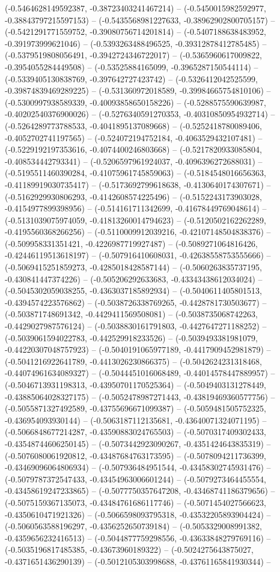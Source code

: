 (-0.5464628149592387, -0.38723403241467214) -- (-0.5450015982592977, -0.38843797215597153) -- (-0.5435568981227633, -0.38962902800705157) -- (-0.5421291771559752, -0.39080756714201814) -- (-0.5407188638483952, -0.391973999621046) -- (-0.5393263488496525, -0.39312878412785485) -- (-0.5379519808056491, -0.3942724346722017) -- (-0.5365960617009822, -0.3954055284449508) -- (-0.53525884165099, -0.3965287150544114) -- (-0.5339405130838769, -0.397642727423742) -- (-0.5326412042525599, -0.39874839469289225) -- (-0.531360972018589, -0.39984665754810106) -- (-0.5300997938589339, -0.40093858650158226) -- (-0.5288575590639987, -0.40202540376900026) -- (-0.5276340591270353, -0.40310850954932714) -- (-0.5264289773788533, -0.4041895137089668) -- (-0.5252418780089406, -0.4052702741197565) -- (-0.524072194752184, -0.4063529432107481) -- (-0.5229192197353616, -0.4074400246803668) -- (-0.5217820933085804, -0.408534442793341) -- (-0.5206597961924037, -0.4096396272688031) -- (-0.5195511460390284, -0.41075961745859063) -- (-0.5184548016656363, -0.41189919030735417) -- (-0.5173692799618638, -0.4130640174307671) -- (-0.5162929930806293, -0.4142608574225496) -- (-0.5152243173903028, -0.4154977899398956) -- (-0.514161711342699, -0.41678449769048614) -- (-0.5131039075974059, -0.41813260014794623) -- (-0.5120502162262289, -0.4195560368266256) -- (-0.5110009912039216, -0.42107148504838376) -- (-0.509958331351421, -0.4226987719927487) -- (-0.5089271064816426, -0.42446119513618197) -- (-0.507916410608031, -0.42638558753555666) -- (-0.5069415251859273, -0.4285018428587144) -- (-0.5060263835737195, -0.430841447374226) -- (-0.505206292633683, -0.43343438612034024) -- (-0.5045302059038255, -0.4363037185892934) -- (-0.5040611405801513, -0.4394574223576862) -- (-0.5038726338769265, -0.4428781730503677) -- (-0.503871748691342, -0.4429411569508081) -- (-0.5038735068742263, -0.4429027987576124) -- (-0.5038830161791803, -0.4427647271188252) -- (-0.5039061594022783, -0.442529918233526) -- (-0.5039493381981079, -0.44220307048757923) -- (-0.5040191065977189, -0.4417909452981879) -- (-0.5041216922641789, -0.4413026230866375) -- (-0.5042624231318468, -0.44074961634089327) -- (-0.5044451016068489, -0.44014578447889957) -- (-0.5046713931198313, -0.43950701170525364) -- (-0.5049403131278449, -0.43885064028327175) -- (-0.5052478987271443, -0.43819469360577756) -- (-0.5055871327492589, -0.43755696671099387) -- (-0.5059481505752325, -0.436954093930144) -- (-0.5063187112135681, -0.43640071324071195) -- (-0.5066848677214287, -0.43590883024765503) -- (-0.5070317409302433, -0.43548744606250145) -- (-0.5073442923090267, -0.4351424643835319) -- (-0.5076080061920812, -0.43487684763173595) -- (-0.5078094211736399, -0.43469096064806934) -- (-0.507936484951544, -0.43458302745931476) -- (-0.5079787372547433, -0.43454963006601244) -- (-0.5079273464455554, -0.43458619247233865) -- (-0.5077750357647208, -0.43468741186379656) -- (-0.5075159367135073, -0.43484761686117746) -- (-0.5071454027566623, -0.4350610471921326) -- (-0.5066598093795318, -0.43532205893904424) -- (-0.5060563588196297, -0.4356252650739184) -- (-0.5053329008991382, -0.4359656232416513) -- (-0.5044877759298556, -0.43633848279769116) -- (-0.5035196817485385, -0.43673960189322) -- (-0.5024275643875027, -0.4371651436290139) -- (-0.5012105303998688, -0.43761165841930344) -- 